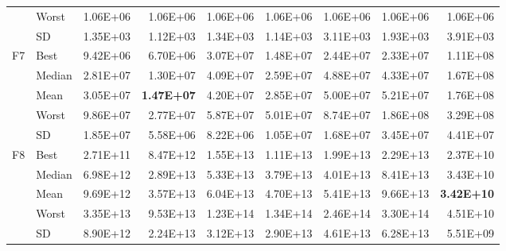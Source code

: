\documentclass[algorithms,article,submit,moreauthors,pdftex]{Definitions/mdpi}
\newcommand{\bestval}[1]{\textbf{#1}}
\begin{document}
\begin{table}[p]
{\begin{tabular}{llrrrrrrr}
 & Worst & 1.06E+06 & 1.06E+06 & 1.06E+06 & 1.06E+06 & 1.06E+06 & 1.06E+06 & 1.06E+06 \\
 & SD & 1.35E+03 & 1.12E+03 & 1.34E+03 & 1.14E+03 & 3.11E+03 & 1.93E+03 & 3.91E+03 \\
\midrule
F7 & Best & 9.42E+06 & 6.70E+06 & 3.07E+07 & 1.48E+07 & 2.44E+07 & 2.33E+07 & 1.11E+08 \\
 & Median & 2.81E+07 & 1.30E+07 & 4.09E+07 & 2.59E+07 & 4.88E+07 & 4.33E+07 & 1.67E+08 \\
 & Mean & 3.05E+07 & \bestval{1.47E+07} & 4.20E+07 & 2.85E+07 & 5.00E+07 & 5.21E+07 & 1.76E+08 \\
 & Worst & 9.86E+07 & 2.77E+07 & 5.87E+07 & 5.01E+07 & 8.74E+07 & 1.86E+08 & 3.29E+08 \\
 & SD & 1.85E+07 & 5.58E+06 & 8.22E+06 & 1.05E+07 & 1.68E+07 & 3.45E+07 & 4.41E+07 \\
\midrule
F8 & Best & 2.71E+11 & 8.47E+12 & 1.55E+13 & 1.11E+13 & 1.99E+13 & 2.29E+13 & 2.37E+10 \\
 & Median & 6.98E+12 & 2.89E+13 & 5.33E+13 & 3.79E+13 & 4.01E+13 & 8.41E+13 & 3.43E+10 \\
 & Mean & 9.69E+12 & 3.57E+13 & 6.04E+13 & 4.70E+13 & 5.41E+13 & 9.66E+13 & \bestval{3.42E+10} \\
 & Worst & 3.35E+13 & 9.53E+13 & 1.23E+14 & 1.34E+14 & 2.46E+14 & 3.30E+14 & 4.51E+10 \\
 & SD & 8.90E+12 & 2.24E+13 & 3.12E+13 & 2.90E+13 & 4.61E+13 & 6.28E+13 & 5.51E+09 \\
\bottomrule
\end{tabular}}
\end{table}
\end{document}
